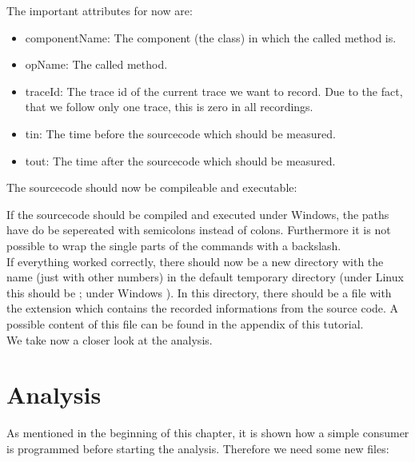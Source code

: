 		The important attributes for now are:
		\begin{itemize}
			\item componentName: The component (the class) in which the called method is.
			\item opName: The called method.
			\item traceId: The trace id of the current trace we want to record. Due to the fact, that we follow only one trace, this is zero in all recordings.
			\item tin: The time before the sourcecode which should be measured.
			\item tout: The time after the sourcecode which should be measured.
		\end{itemize}
		The sourcecode should now be compileable and executable:

		\setBashListing 		
					

		\warning If the sourcecode should be compiled and executed under Windows, the paths have do be sepereated with semicolons instead of colons. Furthermore it is not possible to wrap the single parts of the commands with a backslash.\\
		If everything worked correctly, there should now be a new directory with the name  (just with other numbers) in the default temporary directory (under Linux this should be ; under Windows ). In this directory, there should be a file with the extension  which contains the recorded informations from the source code. A possible content of this file can be found in the appendix of this tutorial.\\
		We take now a closer look at the analysis.

	\section{Analysis}\label{sec:example:analysis}
		As mentioned in the beginning of this chapter, it is shown how a simple consumer is programmed before starting the analysis. Therefore we need some new files:

		
